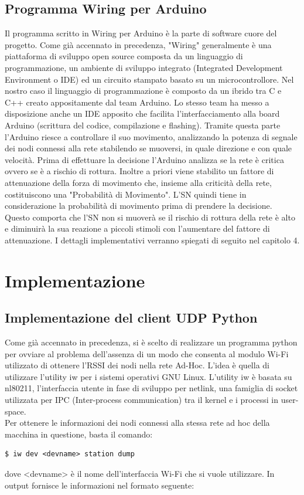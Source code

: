 \documentclass[a4paper,11pt]{report}
\begin{document}
\section{Programma Wiring per Arduino}
  Il programma scritto in Wiring per Arduino è la parte di software cuore del progetto. Come già accennato in precedenza, "Wiring" generalmente è una piattaforma di sviluppo open source composta da un linguaggio di programmazione, un ambiente di sviluppo integrato (Integrated Development Environment o IDE) ed un circuito stampato basato su un microcontrollore. Nel nostro caso il linguaggio di programmazione è composto da un ibrido tra C e C++ creato appositamente dal team Arduino. Lo stesso team ha messo a disposizione anche un IDE apposito che facilita l'interfacciamento alla board Arduino (scrittura del codice, compilazione e flashing). Tramite questa parte l'Arduino riesce a controllare il suo movimento, analizzando la potenza di segnale dei nodi connessi alla rete stabilendo se muoversi, in quale direzione e con quale velocità. Prima di effettuare la decisione l'Arduino analizza se la rete è critica ovvero se è a rischio di rottura. Inoltre a priori viene stabilito un fattore di attenuazione della forza di movimento che, insieme alla criticità della rete, costituiscono una "Probabilità di Movimento". L'SN quindi tiene in considerazione la probabilità di movimento prima di prendere la decisione. Questo comporta che l'SN non si muoverà se il rischio di rottura della rete è alto e diminuirà la sua reazione a piccoli stimoli con l'aumentare del fattore di attenuazione. I dettagli implementativi verranno spiegati di seguito nel capitolo 4.

\chapter{Implementazione}
\section{Implementazione del client UDP Python}
Come già accennato in precedenza, si è scelto di realizzare un programma python per ovviare al problema dell'assenza di un modo che consenta al modulo Wi-Fi utilizzato di ottenere l'RSSI dei nodi nella rete Ad-Hoc. L'idea è quella di utilizzare l'utility iw per i sistemi operativi GNU Linux. L'utility iw è basata su nl80211, l'interfaccia utente in fase di sviluppo per netlink, una famiglia di socket utilizzata per IPC (Inter-process communication) tra il kernel e i processi in user-space.\\
Per ottenere le informazioni dei nodi connessi alla stessa rete ad hoc della macchina in questione, basta il comando:
\begin{lstlisting}
$ iw dev <devname> station dump
\end{lstlisting}
dove <devname> è il nome dell'interfaccia Wi-Fi che si vuole utilizzare.
In output fornisce le informazioni nel formato seguente:
\end{document}

